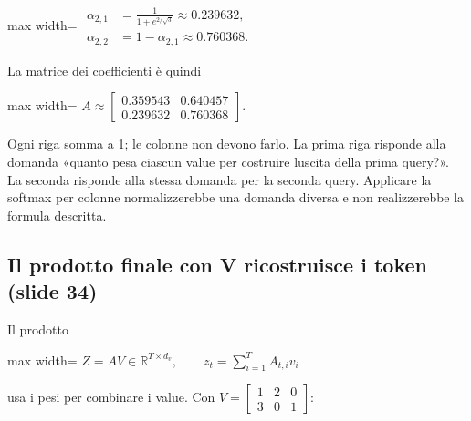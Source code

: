 \documentclass[11pt,a4paper,oneside,openany]{book}
\begin{document}
\begin{center}
\begin{adjustbox}{max width=\linewidth}
$\displaystyle 
\begin{aligned}
\alpha_{2,1}&=\frac1{1+e^{2/\sqrt3}}\approx0.239632,\\
\alpha_{2,2}&=1-\alpha_{2,1}\approx0.760368.
\end{aligned}
$
\end{adjustbox}
\end{center}

La matrice dei coefficienti è quindi

\begin{center}
\begin{adjustbox}{max width=\linewidth}
$\displaystyle \boxed{A\approx\begin{bmatrix}0.359543&0.640457\\0.239632&0.760368\end{bmatrix}.}$
\end{adjustbox}
\end{center}

Ogni riga somma a 1; le colonne non devono farlo. La prima riga risponde alla domanda «quanto pesa ciascun value per costruire l\textquotesingle uscita della prima query?». La seconda risponde alla stessa domanda per la seconda query. Applicare la softmax per colonne normalizzerebbe una domanda diversa e non realizzerebbe la formula descritta.

\subsection{Il prodotto finale con V ricostruisce i token (slide 34)}\label{f04-r693}

Il prodotto

\begin{center}
\begin{adjustbox}{max width=\linewidth}
$\displaystyle \boxed{Z=AV\in\mathbb R^{T\times d_v},\qquad z_t=\sum_{i=1}^{T}A_{t,i}v_i}$
\end{adjustbox}
\end{center}

usa i pesi per combinare i value. Con \(V=\begin{bmatrix}1&2&0\\3&0&1\end{bmatrix}\):
\end{document}
